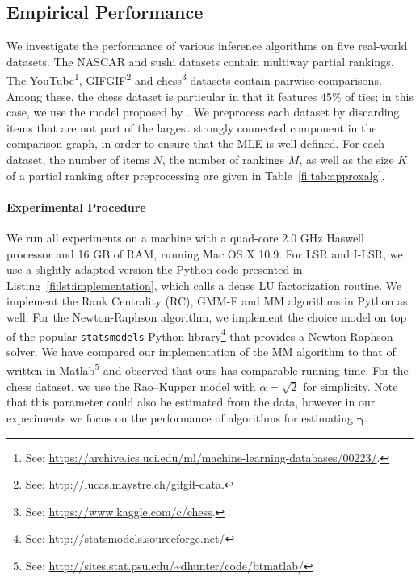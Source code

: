 \subsection{Empirical Performance}

We investigate the performance of various inference algorithms on five real-world datasets.
The NASCAR \citep{hunter2004mm} and sushi \citep{kamishima2009efficient} datasets contain multiway partial rankings.
The YouTube\footnote{%
See: \url{https://archive.ics.uci.edu/ml/machine-learning-databases/00223/}.},
GIFGIF\footnote{%
See: \url{http://lucas.maystre.ch/gifgif-data}.}
and chess\footnote{%
See: \url{https://www.kaggle.com/c/chess}.}
datasets contain pairwise comparisons.
Among these, the chess dataset is particular in that it features 45\% of ties;
in this case, we use the model proposed by \citet{rao1967ties}.
We preprocess each dataset by discarding items that are not part of the largest strongly connected component in the comparison graph, in order to ensure that the MLE is well-defined.
For each  dataset, the number of items $N$, the number of rankings $M$, as well as the size $K$ of a partial ranking after preprocessing are given in Table~\ref{fi:tab:approxalg}.

\paragraph{Experimental Procedure}
We run all experiments on a machine with a quad-core 2.0 GHz Haswell processor and 16 GB of RAM, running Mac OS X 10.9.
For LSR and I-LSR, we use a slightly adapted version the Python code presented in Listing~\ref{fi:lst:implementation}, which calls a dense LU factorization routine.
We implement the Rank Centrality (RC), GMM-F and MM \citep{hunter2004mm} algorithms in Python as well.
For the Newton-Raphson algorithm, we implement the choice model on top of the popular \texttt{statsmodels} Python library\footnote{%
See: \url{http://statsmodels.sourceforge.net/}
} that provides a Newton-Raphson solver.
We have compared our implementation of the MM algorithm to that of \citeauthor{hunter2004mm} written in Matlab\footnote{%
See: \url{http://sites.stat.psu.edu/~dhunter/code/btmatlab/}
} and observed that ours has comparable running time.
For the chess dataset, we use the Rao--Kupper model with $\alpha = \sqrt{2}$ for simplicity.
Note that this parameter could also be estimated from the data, however in our experiments we focus on the performance of algorithms for estimating $\bm{\gamma}$.

